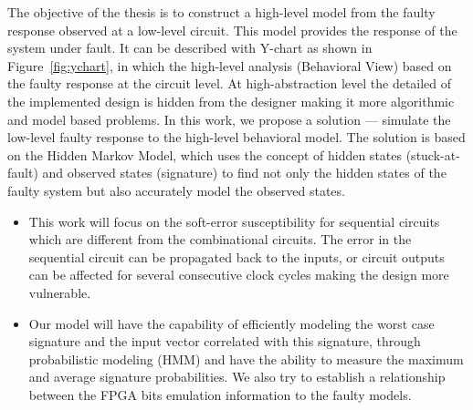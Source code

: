 The objective of the thesis is to construct a high-level model from the faulty response observed at a low-level circuit. This model provides the response of the system under fault. It can be described with Y-chart as shown in Figure~\ref{fig:ychart}, in which the high-level analysis (Behavioral View) based on the faulty response at the circuit level. At high-abstraction level the detailed of the implemented design is hidden from the designer making it more algorithmic and model based problems. In this work, we propose a solution --- simulate the low-level faulty response to the high-level behavioral model. The solution is based on the Hidden Markov Model, which uses the concept of hidden states  (stuck-at-fault) and observed states (signature) to find not only the hidden states of the faulty system but also accurately model the observed states. 

\begin{itemize}
\item This work will focus on the soft-error susceptibility for sequential circuits which are different from the combinational circuits. The error in the sequential circuit can be propagated back to the inputs, or circuit outputs can be affected for several consecutive clock cycles making the design more vulnerable.  
\item Our model will have the capability of efficiently modeling the worst case signature and the input vector correlated with this signature, through probabilistic modeling (HMM) and have the ability to measure the maximum and average signature probabilities. We also try to establish a relationship between the FPGA bits emulation information to the faulty models.

\end{itemize}
